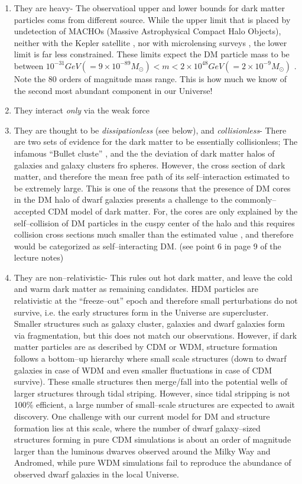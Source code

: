\documentclass[paper=a4, fontsize=11pt]{scrartcl} %
\numberwithin{equation}{section} %
\numberwithin{figure}{section} %
\numberwithin{table}{section} %
\begin{document}
  \begin{enumerate}
  \item They are heavy- The observatioal upper and lower bounds for dark matter particles coms from different source. While the upper limit that is placed by undetection of MACHOs (Massive Astrophysical Compact Halo Objects), neither with the Kepler satellite \citep[41][]{}, nor with microlensing surveys \citep[42\&43][]{}, the lower limit is far less constrained. These limits expect the DM particle mass to be between $10^\mathrm{-31} GeV (= 9\times 10^\mathrm{-89} M_\odot) < m < 2\times 10^\mathrm{48} GeV (= 2 \times 10^\mathrm{-9} M_\odot)$ \citep[47 for lower bound, and 42 \& 43 for the upper bound][]{}. Note the 80 orders of magnitude mass range. This is how much we know of the second most abundant component in our Universe!
  \item They interact \emph{only} via the weak force
  \item They are thought to be \emph{dissipationless} (see below), and \emph{collisionless}- There are two sets of evidence for the dark matter to be essentially collisionless; The infamous ``Bullet cluste'' \citep[17][]{}, and the the deviation of dark matter halos of galaxies and galaxy clusters fro spheres. However, the cross section of dark matter, and therefore the mean free path of its self--interaction estimated to be extremely large. This is one of the reasons that the presence of DM cores in the DM halo of dwarf galaxies presents a challenge to the commonly--accepted CDM model of dark matter. For, the cores are only explained by the self--collision of DM particles in the cuspy center of the halo and this requires collision cross sections much smaller than the estimated value \citep[49][]{}, and therefore would be categorized as self--interacting DM. (see point 6 in page 9 of the lecture notes)
  \item They are non--relativistic- This rules out hot dark matter, and leave the cold and warm dark matter as remaining candidates. HDM particles are relativistic at the ``freeze--out'' epoch and therefore small perturbations do not survive, i.e. the early structures form in the Universe are supercluster. Smaller structures such as galaxy cluster, galaxies and dwarf galaxies form via fragmentation, but this does not match our observations. However, if dark matter particles are as described by CDM or WDM, structure formation follows a bottom--up hierarchy where small scale structures (down to dwarf galaxies in case of WDM and even smaller fluctuations in case of CDM survive). These smalle structures then merge/fall into the potential wells of larger structures through tidal striping. However, since tidal stripping is not 100\% efficient, a large number of small--scale structures are expected to await discovery. One challenge with our current model for DM and structure formation lies at this scale, where the number of dwarf galaxy--sized structures forming in pure CDM simulations is about an order of magnitude larger than the luminous dwarves observed around the Milky Way and Andromed, while pure WDM simulations fail to reproduce the abundance of observed dwarf galaxies in the local Universe.

\end{enumerate}
\end{document}

